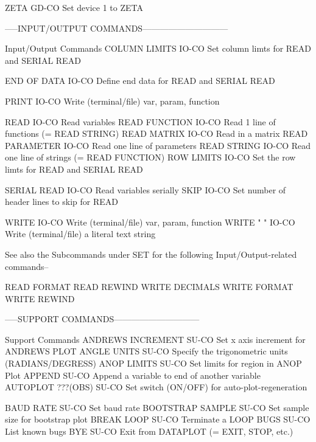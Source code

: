 ZETA                        GD-CO Set device 1 to ZETA

-----INPUT/OUTPUT COMMANDS------------------------------

Input/Output Commands
COLUMN LIMITS               IO-CO Set column limts for READ and SERIAL READ

END OF DATA                 IO-CO Define end data for READ and SERIAL READ

PRINT                       IO-CO Write (terminal/file) var, param, function

READ                        IO-CO Read variables
READ FUNCTION               IO-CO Read 1 line of functions (= READ STRING)
READ MATRIX                 IO-CO Read in a matrix
READ PARAMETER              IO-CO Read one line of parameters
READ STRING                 IO-CO Read one line of strings (= READ FUNCTION)
ROW LIMITS                  IO-CO Set the row limts for READ and SERIAL READ

SERIAL READ                 IO-CO Read variables serially
SKIP                        IO-CO Set number of header lines to skip for READ

WRITE                       IO-CO Write (terminal/file) var, param, function
WRITE "  "                  IO-CO Write (terminal/file) a literal text string

See also the    Subcommands under SET    for the following
Input/Output-related commands--

    READ FORMAT
    READ REWIND
    WRITE DECIMALS
    WRITE FORMAT
    WRITE REWIND

-----SUPPORT COMMANDS------------------------------

Support Commands
ANDREWS INCREMENT           SU-CO Set x axis increment for ANDREWS PLOT
ANGLE UNITS                 SU-CO Specify the trigonometric units (RADIANS/DEGRESS)
ANOP LIMITS                 SU-CO Set limits for region in ANOP Plot
APPEND                      SU-CO Append a variable to end of another variable
AUTOPLOT ???(OBS)           SU-CO Set switch (ON/OFF) for auto-plot-regeneration

BAUD RATE                   SU-CO Set baud rate
BOOTSTRAP SAMPLE            SU-CO Set sample size for bootstrap plot 
BREAK LOOP                  SU-CO Terminate a LOOP
BUGS                        SU-CO List known bugs
BYE                         SU-CO Exit from DATAPLOT (= EXIT, STOP, etc.)

